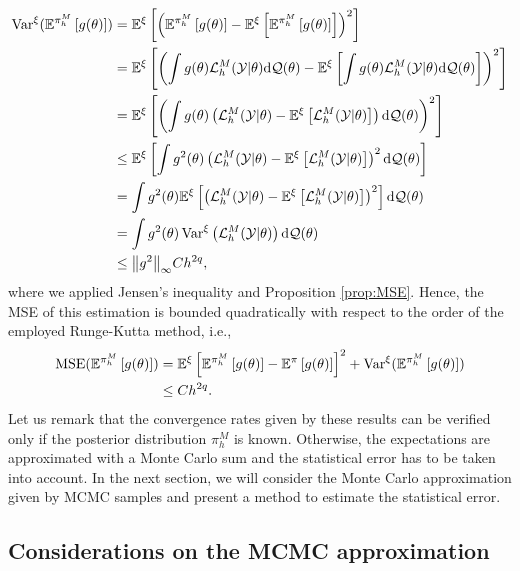 \begin{equation}
\begin{aligned}
	\operatorname{Var}^\xi (\mathbb{E}^{\pi_h^M}\left[g(\theta)\right]) &= \mathbb{E}^\xi\left[\left(\mathbb{E}^{\pi^M_h}\left[g(\theta)\right]
													-\mathbb{E}^\xi\left[\mathbb{E}^{\pi^M_h}\left[g(\theta)\right]
													\right]\right)^2\right]\\
		&= \mathbb{E}^\xi\left[\left(\int g(\theta) \mathcal{L}_h^M(\mathcal{Y}|\theta)\dd\mathcal{Q}(\theta) 
		- \mathbb{E}^\xi\left[\int g(\theta) \mathcal{L}_h^M(\mathcal{Y}|\theta)\dd\mathcal{Q}(\theta)\right]
		\right)^2\right]\\
		&=\mathbb{E}^\xi\left[\left(\int g(\theta) \left(\mathcal{L}_h^M(\mathcal{Y}|\theta)-\mathbb{E}^\xi\left[\mathcal{L}_h^M(\mathcal{Y}|\theta)\right]\right)\dd\mathcal{Q}(\theta) 
		\right)^2\right]\\
		&\leq \mathbb{E}^\xi\left[\int g^2(\theta) \left(\mathcal{L}_h^M(\mathcal{Y}|\theta)-\mathbb{E}^\xi\left[\mathcal{L}_h^M(\mathcal{Y}|\theta)\right]\right)^2\dd\mathcal{Q}(\theta) 
		\right]\\
		&= \int g^2(\theta) \mathbb{E}^\xi\left[\left(\mathcal{L}_h^M(\mathcal{Y}|\theta)-\mathbb{E}^\xi\left[\mathcal{L}_h^M(\mathcal{Y}|\theta)\right]\right)^2\right]\dd\mathcal{Q}(\theta) \\
		&= \int g^2(\theta) \operatorname{Var}^\xi\left(\mathcal{L}_h^M(\mathcal{Y}|\theta)\right)\dd\mathcal{Q}(\theta) \\
		&\leq \norm{g^2}_\infty C h^{2q},
\end{aligned}
\end{equation}
where we applied Jensen's inequality and Proposition \ref{prop:MSE}. Hence, the MSE of this estimation is bounded quadratically with respect to the order of the employed Runge-Kutta method, i.e.,  
\begin{equation}
\begin{aligned}
	\operatorname{MSE}(\mathbb{E}^{\pi_h^M}\left[g(\theta)\right]) &= \mathbb{E}^\xi\left[\mathbb{E}^{\pi_h^M}\left[g(\theta)\right] - \mathbb{E}^{\pi}\left[g(\theta)\right]\right]^2 + \operatorname{Var}^\xi(\mathbb{E}^{\pi_h^M}\left[g(\theta)\right]) \\
	&\leq C h^{2q}.
\end{aligned}
\end{equation}
Let us remark that the convergence rates given by these results can be verified only if the posterior distribution $\pi_h^M$ is known. Otherwise, the expectations are approximated with a Monte Carlo sum and the statistical error has to be taken into account. In the next section, we will consider the Monte Carlo approximation given by MCMC samples and present a method to estimate the statistical error. 

\subsection{Considerations on the MCMC approximation}


